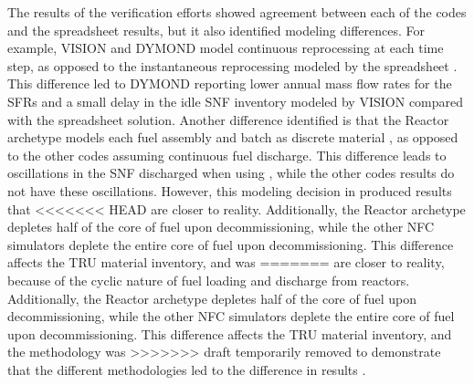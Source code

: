 The results of the verification efforts showed agreement between each 
of the codes and the spreadsheet results, but it also identified modeling 
differences. For example, \gls{VISION} and \gls{DYMOND} model continuous 
reprocessing at each time step, as opposed to the instantaneous 
reprocessing modeled by the spreadsheet \cite{feng_standardized_2016}. 
This difference led to \gls{DYMOND} reporting lower annual mass flow 
rates for the \glspl{SFR} and a small delay in the idle \gls{SNF} 
inventory modeled by \gls{VISION} compared with the spreadsheet 
solution. 
Another difference identified is that the \Cycamore Reactor 
archetype models each fuel assembly and batch as discrete material 
\cite{bae_standardized_2019}, as 
opposed to the other codes assuming continuous fuel discharge. 
This difference leads to oscillations in the \gls{SNF} discharged 
when using \Cyclus, while the other codes results do not have these 
oscillations.
However, this modeling decision in \Cyclus produced results that 
<<<<<<< HEAD
are closer to reality. 
Additionally, the \Cycamore Reactor archetype depletes half of the 
core of fuel upon decommissioning, while the other \gls{NFC} simulators 
deplete the entire core of fuel upon decommissioning. This 
difference affects the \gls{TRU} material inventory, and was 
=======
are closer to reality, because of the cyclic nature of fuel 
loading and discharge from reactors. 
Additionally, the \Cycamore Reactor archetype depletes half of the 
core of fuel upon decommissioning, while the other \gls{NFC} simulators 
deplete the entire core of fuel upon decommissioning. This 
difference affects the \gls{TRU} material inventory, and the 
methodology was 
>>>>>>> draft
temporarily removed to demonstrate that the different 
methodologies led to the difference in results \cite{bae_standardized_2019}.

